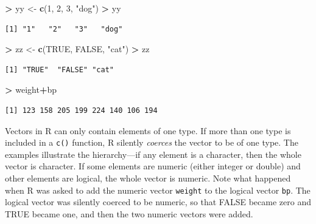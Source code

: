 \documentclass[
]{krantz}
\makeatletter
\newenvironment{Shaded}{\begin{snugshade}}{\end{snugshade}}
\newcommand{\DecValTok}[1]{\textcolor[rgb]{0.06,0.06,0.06}{#1}}
\newcommand{\KeywordTok}[1]{\textcolor[rgb]{0.27,0.27,0.27}{\textbf{#1}}}
\newcommand{\NormalTok}[1]{#1}
\newcommand{\OperatorTok}[1]{\textcolor[rgb]{0.43,0.43,0.43}{\textbf{#1}}}
\newcommand{\OtherTok}[1]{\textcolor[rgb]{0.37,0.37,0.37}{#1}}
\newcommand{\StringTok}[1]{\textcolor[rgb]{0.5,0.5,0.5}{#1}}
\newenvironment{kframe}{%
\medskip{}
\setlength{\fboxsep}{.8em}
 \def\at@end@of@kframe{}%
 \ifinner\ifhmode%
  \def\at@end@of@kframe{\end{minipage}}%
  \begin{minipage}{\columnwidth}%
 \fi\fi%
 \def\FrameCommand##1{\hskip\@totalleftmargin \hskip-\fboxsep
 \colorbox{shadecolor}{##1}\hskip-\fboxsep
     \hskip-\linewidth \hskip-\@totalleftmargin \hskip\columnwidth}%
 \MakeFramed {\advance\hsize-\width
   \@totalleftmargin\z@ \linewidth\hsize
   \@setminipage}}%
 {\par\unskip\endMakeFramed%
 \at@end@of@kframe}
\renewenvironment{Shaded}{\begin{kframe}}{\end{kframe}}
\makeatother
\begin{document}
\begin{Shaded}
\begin{Highlighting}[]
\OperatorTok{\textgreater{}}\StringTok{ }\NormalTok{yy \textless{}{-}}\StringTok{ }\KeywordTok{c}\NormalTok{(}\DecValTok{1}\NormalTok{, }\DecValTok{2}\NormalTok{, }\DecValTok{3}\NormalTok{, }\StringTok{"dog"}\NormalTok{)}
\OperatorTok{\textgreater{}}\StringTok{ }\NormalTok{yy}
\end{Highlighting}
\end{Shaded}

\begin{verbatim}
[1] "1"   "2"   "3"   "dog"
\end{verbatim}

\begin{Shaded}
\begin{Highlighting}[]
\OperatorTok{\textgreater{}}\StringTok{ }\NormalTok{zz \textless{}{-}}\StringTok{ }\KeywordTok{c}\NormalTok{(}\OtherTok{TRUE}\NormalTok{, }\OtherTok{FALSE}\NormalTok{, }\StringTok{"cat"}\NormalTok{)}
\OperatorTok{\textgreater{}}\StringTok{ }\NormalTok{zz}
\end{Highlighting}
\end{Shaded}

\begin{verbatim}
[1] "TRUE"  "FALSE" "cat"  
\end{verbatim}

\begin{Shaded}
\begin{Highlighting}[]
\OperatorTok{\textgreater{}}\StringTok{ }\NormalTok{weight}\OperatorTok{+}\NormalTok{bp}
\end{Highlighting}
\end{Shaded}

\begin{verbatim}
[1] 123 158 205 199 224 140 106 194
\end{verbatim}

Vectors in R can only contain elements of one type. If more than one type is included in a \texttt{c()} function, R silently \emph{coerces} the vector to be of one type. The examples illustrate the hierarchy---if any element is a character, then the whole vector is character. If some elements are numeric (either integer or double) and other elements are logical, the whole vector is numeric. Note what happened when R was asked to add the numeric vector \texttt{weight} to the logical vector \texttt{bp}. The logical vector was silently coerced to be numeric, so that FALSE became zero and TRUE became one, and then the two numeric vectors were added.
\end{document}
